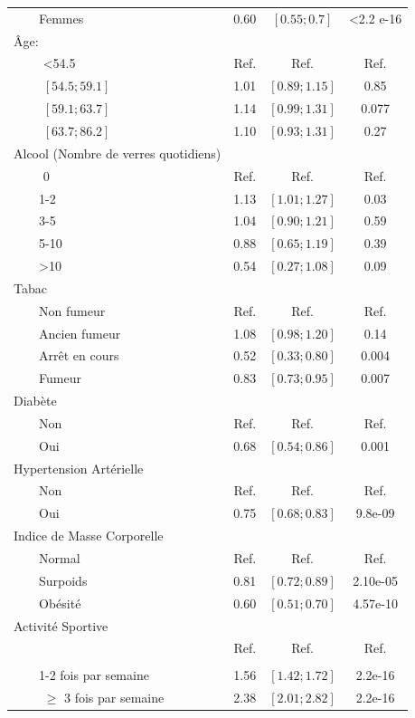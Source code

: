 \documentclass{book}
\begin{document}
\begin{longtable}{lccc}
$\qquad$Femmes & 0.60& $\left[0.55 ; 0.7 \right]$ & <2.2 e-16\\
Âge: &&&\\
$\qquad$ <54.5 &Ref.&Ref.&Ref.\\
$\qquad$ $\left[54.5 ; 59.1 \right]$ &1.01& $\left[0.89 ; 1.15 \right]$& 0.85\\
$\qquad$ $\left[59.1 ; 63.7\right]$ &1.14&$\left[0.99 ; 1.31 \right]$& 0.077\\
$\qquad$ $\left[63.7 ; 86.2 \right]$&1.10&$\left[0.93 ; 1.31 \right]$&0.27\\
Alcool (Nombre de verres quotidiens)&&&\\
$\qquad$ 0 &Ref.&Ref.&Ref.\\
$\qquad$1-2 &	1.13	& $\left[1.01 ; 1.27 \right]$	&	0.03\\
$\qquad$3-5&		1.04& $\left[0.90 ; 1.21 \right]$	&	0.59\\
$\qquad$5-10&	0.88& $\left[0.65 ; 1.19 \right]$	&	0.39\\
$\qquad$>10&		0.54& $\left[0.27 ; 1.08 \right]$	&	0.09\\
Tabac&&&\\
$\qquad$Non fumeur& Ref.& Ref.&Ref.\\
$\qquad$Ancien fumeur&1.08&$\left[0.98 ; 1.20 \right]$ &0.14\\
$\qquad$Arrêt en cours& 0.52 & $\left[0.33 ; 0.80 \right]$&0.004\\
$\qquad$Fumeur&0.83 & $\left[0.73 ; 0.95 \right]$& 0.007\\
Diabète&&&\\
$\qquad$Non &Ref.&Ref.&Ref.\\
$\qquad$Oui & 0.68 & $\left[0.54 ; 0.86 \right]$ & 0.001\\
Hypertension Artérielle&&&\\
$\qquad$Non &Ref.&Ref.&Ref.\\
$\qquad$Oui&0.75& $\left[0.68 ; 0.83 \right]$&9.8e-09\\
Indice de Masse Corporelle &&&\\
$\qquad$Normal&Ref.&Ref.&Ref.\\
$\qquad$Surpoids&0.81&$\left[0.72 ; 0.89 \right]$ &2.10e-05\\
$\qquad$Obésité&0.60&$\left[0.51 ; 0.70 \right]$&4.57e-10\\
Activité Sportive&&&\\
$\qquad$&Ref.&Ref.&Ref.\\\\
$\qquad$1-2 fois par semaine&1.56& $\left[1.42 ; 1.72 \right]$& 2.2e-16\\
$\qquad$ $\geq$ 3 fois par semaine& 2.38& $\left[2.01 ; 2.82 \right]$ & 2.2e-16\\
    \hline
    \end{longtable} 
\end{document}
